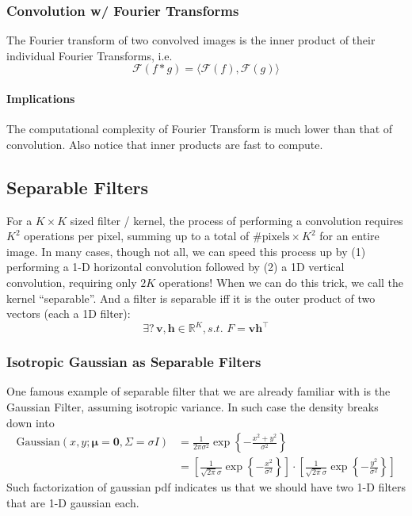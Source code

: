 \documentclass[11pt]{article}
\newcommand{\bh}{\mathbf{h}}
\newcommand{\bv}{\mathbf{v}}
\newcommand{\bzero}{\mathbf{0}}
\newcommand{\real}{\mathbb{R}}
\begin{document}
\subsubsection{Convolution w/ Fourier Transforms}
The Fourier transform of two convolved images is the inner product of their individual Fourier Transforms, i.e.
\begin{equation}
	\mathcal{F}(f * g)= \langle \mathcal{F}(f), \mathcal{F}(g) \rangle
\end{equation}
\paragraph{Implications} The computational complexity of Fourier Transform is much lower than that of convolution. Also notice that inner products are fast to compute. 


\subsection{Separable Filters}
For a $K \times K$ sized filter / kernel, the process of performing a convolution requires $K^2$ operations per pixel, summing up to a total of $\#\text{pixels} \times K^2$ for an entire image. In many cases, though not all, we can speed this process up by (1) performing a 1-D horizontal convolution followed by (2) a 1D vertical convolution, requiring only $2K$ operations! When we can do this trick, we call the kernel ``separable''. And a filter is separable iff it is the outer product of two vectors (each a 1D filter):
\begin{equation}
	\exists?\, \bv, \bh \in \real^K, s.t.\,\, F=\mathbf{v} \mathbf{h}^{\top}	
\end{equation}

\subsubsection{Isotropic Gaussian as Separable Filters}
One famous example of separable filter that we are already familiar with is the Gaussian Filter, assuming isotropic variance. In such case the density breaks down into 
\begin{align}
	\text{Gaussian}(x, y; \boldsymbol \mu = \bzero, \Sigma = \sigma I) 
	&= \frac{1}{2 \pi \sigma^{2}} \exp \left\{-\frac{x^{2}+y^{2}}{\sigma^{2}}\right\} \\
	&= \left[\frac{1}{\sqrt{2 \pi} \sigma} \exp\left\{-\frac{x^{2}}{\sigma^{2}}\right\}\right] \cdot\left[\frac{1}{\sqrt{2 \pi} \sigma} \exp\left\{-\frac{y^{2}}{\sigma^{2}}\right\}\right]
\end{align}
Such factorization of gaussian pdf indicates us that we should have two 1-D filters that are 1-D gaussian each. 
\end{document}
